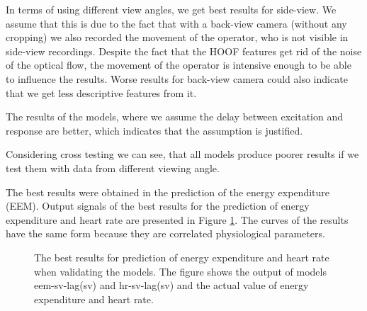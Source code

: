 In terms of using different view angles, we get best results for side-view. We assume that this is due to the fact that with a back-view camera (without any cropping) we also recorded the movement of the operator, who is not visible in side-view recordings. Despite the fact that the HOOF features get rid of the noise of the optical flow, the movement of the operator is intensive enough to be able to influence the results. Worse results for back-view camera could also indicate that we get less descriptive features from it. 

The results of the models, where we assume the delay between excitation and response are better, which indicates that the assumption is justified.

Considering cross testing we can see, that all models produce poorer results if we test them with data from different viewing angle.

The best results were obtained in the prediction of the energy expenditure (EEM). Output signals of the best results for the prediction of energy expenditure and heart rate are presented in Figure \ref{fig:rezultat}. The curves of the results have the same form because they are correlated physiological parameters.

\begin{figure}[!htb]
	\centering
    \caption{The best results for prediction of energy expenditure and heart rate when validating the models. The figure shows the output of models eem-sv-lag(sv) and hr-sv-lag(sv) and the actual value of energy expenditure and heart rate.}
    \label{fig:rezultat}
\end{figure}















